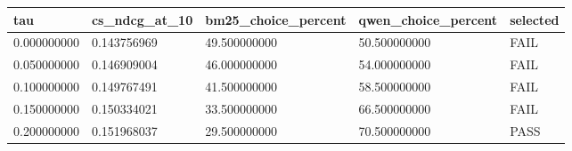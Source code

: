 \begin{tabular}{lllll}
\toprule
tau & cs\_ndcg\_at\_10 & bm25\_choice\_percent & qwen\_choice\_percent & selected \\
\midrule
0.000000000 & 0.143756969 & 49.500000000 & 50.500000000 & FAIL \\
0.050000000 & 0.146909004 & 46.000000000 & 54.000000000 & FAIL \\
0.100000000 & 0.149767491 & 41.500000000 & 58.500000000 & FAIL \\
0.150000000 & 0.150334021 & 33.500000000 & 66.500000000 & FAIL \\
0.200000000 & 0.151968037 & 29.500000000 & 70.500000000 & PASS \\
\bottomrule
\end{tabular}
